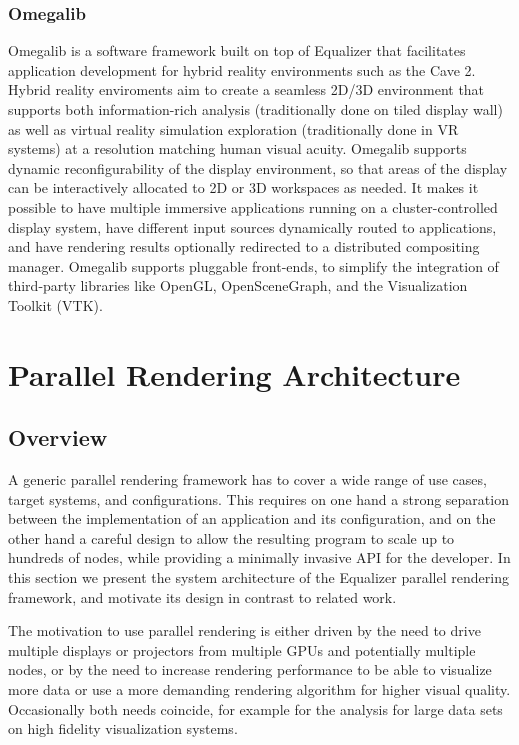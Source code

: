 \subsection{Omegalib}

Omegalib \cite{Omegalib} is a software framework built on top of Equalizer that
facilitates application development for hybrid reality environments such as the
Cave 2. Hybrid reality enviroments aim to create a seamless 2D/3D environment
that supports both information-rich analysis (traditionally done on tiled
display wall) as well as virtual reality simulation exploration (traditionally
done in VR systems) at a resolution matching human visual acuity. Omegalib
supports dynamic reconfigurability of the display environment, so that areas of
the display can be interactively allocated to 2D or 3D workspaces as needed. It
makes it possible to have multiple immersive applications running on a
cluster-controlled display system, have different input sources dynamically
routed to applications, and have rendering results optionally redirected to a
distributed compositing manager. Omegalib supports pluggable front-ends, to
simplify the integration of third-party libraries like OpenGL, OpenSceneGraph,
and the Visualization Toolkit (VTK).


\chapter{Parallel Rendering Architecture}\label{sArchitecture}

\section{Overview}
A generic parallel rendering framework has to cover a wide range of use cases,
target systems, and configurations. This requires on one hand a strong
separation between the implementation of an application and its configuration,
and on the other hand a careful design to allow the resulting program to scale
up to hundreds of nodes, while providing a minimally invasive API for the
developer. In this section we present the system architecture of the Equalizer
parallel rendering framework, and motivate its design in contrast to related
work.

The motivation to use parallel rendering is either driven by the need to drive
multiple displays or projectors from multiple GPUs and potentially multiple
nodes, or by the need to increase rendering performance to be able to visualize
more data or use a more demanding rendering algorithm for higher visual quality.
Occasionally both needs coincide, for example for the analysis for large data
sets on high fidelity visualization systems.

